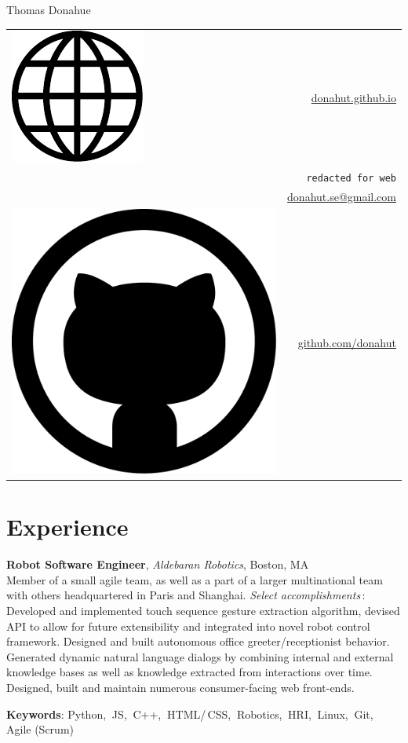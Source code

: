 \documentclass[10pt, letter]{article}
\newcommand*\globe{\includegraphics[height=1.6ex]{globe.pdf}}
\newcommand*\github{\includegraphics[height=2ex]{github.pdf}}
\newcommand{\years}[1]{\marginnote{\footnotesize #1}}
\newenvironment{desc*}{
  \begin{description}
    \setlength{\itemsep}{0.2pt}
    \setlength{\parskip}{-1pt}
    \setlength{\parsep}{0pt}
  }{
  \end{description}
}
\begin{document}
\begin{minipage}[t]{0.55\textwidth}
  {\Huge Thomas Donahue}
\end{minipage}
\begin{minipage}[t]{0.45\textwidth}
  \flushright 
  \begin{tabular}[h]{lr}
    \globe{}    & \href{http://donahut.github.io}{donahut.github.io}\\    
    \Phone{}    & \texttt{redacted for web}\\
    \Envelope{} & \href{mailto:donahut.se@gmail.com}{donahut.se@gmail.com}\\    
    \github{}   & \href{http://www.github.com/donahut}{github.com/donahut}
  \end{tabular}
\end{minipage}

\section*{Experience}
\years{Mar 2014 --} 
\textbf{\fontsize{10.5pt}{1em}\selectfont Robot Software Engineer},
\textsl{Aldebaran Robotics}, Boston, MA\\

\vspace{-.3cm} 
Member of a small agile team, as well as a part of a larger
multinational team with others headquartered in Paris and Shanghai.
\textsl{Select accomplishments}\,:\, Developed and implemented touch
sequence gesture extraction algorithm, devised API to allow for future
extensibility and integrated into novel robot control framework.
Designed and built autonomous office greeter/receptionist behavior.
Generated dynamic natural language dialogs by combining internal and
external knowledge bases as well as knowledge extracted from
interactions over time. Designed, built and maintain numerous
consumer-facing web front-ends.
\vspace{-.1cm}
\begin{desc*}
\item[\rm \color{Green} \textbf{Keywords}:] Python,$\:$ JS,$\:$ C++,$\:$ HTML/\,CSS,$\:$
  Robotics,$\:$ HRI,$\:$ Linux,$\:$ Git,$\:$ Agile (Scrum)\\
\end{desc*}
\end{document}
